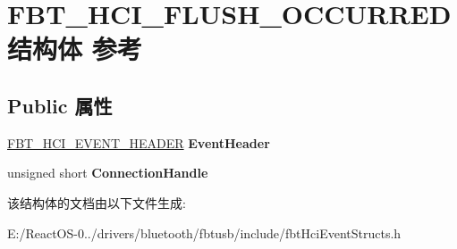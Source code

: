 \hypertarget{struct_f_b_t___h_c_i___f_l_u_s_h___o_c_c_u_r_r_e_d}{}\section{F\+B\+T\+\_\+\+H\+C\+I\+\_\+\+F\+L\+U\+S\+H\+\_\+\+O\+C\+C\+U\+R\+R\+E\+D结构体 参考}
\label{struct_f_b_t___h_c_i___f_l_u_s_h___o_c_c_u_r_r_e_d}
\subsection*{Public 属性}
\begin{DoxyCompactItemize}
\item 
\mbox{\label{struct_f_b_t___h_c_i___f_l_u_s_h___o_c_c_u_r_r_e_d_a683bb80672c04b78f5704e952b29c203}} 
\hyperlink{struct_f_b_t___h_c_i___e_v_e_n_t___h_e_a_d_e_r}{F\+B\+T\+\_\+\+H\+C\+I\+\_\+\+E\+V\+E\+N\+T\+\_\+\+H\+E\+A\+D\+ER} {\bfseries Event\+Header}
\item 
\mbox{\label{struct_f_b_t___h_c_i___f_l_u_s_h___o_c_c_u_r_r_e_d_a8ce969adfb805643c23ff26513231c37}} 
unsigned short {\bfseries Connection\+Handle}
\end{DoxyCompactItemize}


该结构体的文档由以下文件生成\+:\begin{DoxyCompactItemize}
\item 
E\+:/\+React\+O\+S-\/0../drivers/bluetooth/fbtusb/include/fbt\+Hci\+Event\+Structs.\+h\end{DoxyCompactItemize}
